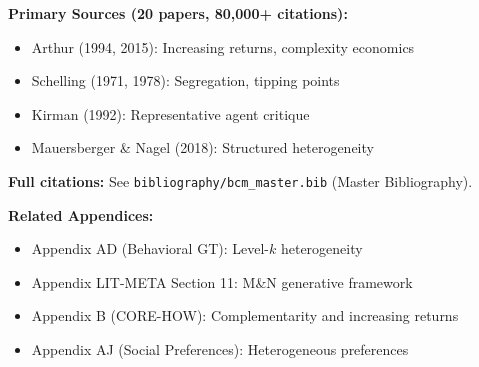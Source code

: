 \textbf{Primary Sources (20 papers, 80,000+ citations):}
\begin{itemize}[nosep]
    \item Arthur (1994, 2015): Increasing returns, complexity economics
    \item Schelling (1971, 1978): Segregation, tipping points
    \item Kirman (1992): Representative agent critique
    \item Mauersberger \& Nagel (2018): Structured heterogeneity
\end{itemize}

\textbf{Full citations:} See \texttt{bibliography/bcm\_master.bib} (Master Bibliography).

\textbf{Related Appendices:}
\begin{itemize}[nosep]
    \item Appendix AD (Behavioral GT): Level-$k$ heterogeneity
    \item Appendix LIT-META Section 11: M\&N generative framework
    \item Appendix B (CORE-HOW): Complementarity and increasing returns
    \item Appendix AJ (Social Preferences): Heterogeneous preferences
\end{itemize}

